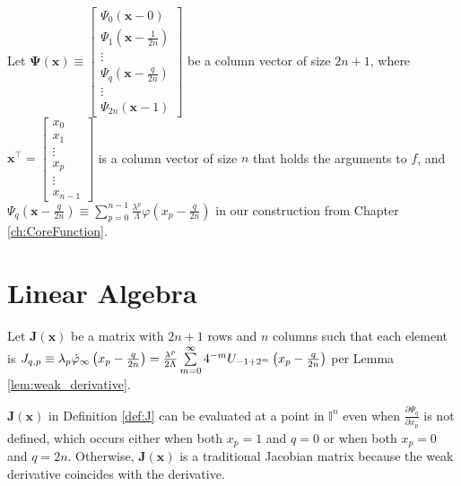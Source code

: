 \begin{definition}
  \label{def:Psi_vector}
  Let $\boldsymbol{\Psi}\left(\mathbf{x}\right) \equiv \begin{bmatrix}
      \Psi_0\left(\mathbf{x} - 0\right) \\
      \Psi_1\left(\mathbf{x} - \frac{1}{2n}\right) \\
      \vdots \\
      \Psi_q\left(\mathbf{x} - \frac{q}{2n}\right) \\
      \vdots \\
      \Psi_{2n}\left(\mathbf{x} - 1\right)
  \end{bmatrix}$ be a column vector of size $2n + 1$, where $\mathbf{x}^\top = \begin{bmatrix}
      x_0 \\ x_1 \\ \vdots \\ x_p \\ \vdots \\ x_{n - 1}
  \end{bmatrix}$ is a column vector of size $n$ that holds the arguments to $f$, and $\Psi_q\left(\mathbf{x} - \frac{q}{2n}\right) \equiv \sum\limits_{p = 0}^{n - 1} \frac{\lambda^p}{\Lambda} \varphi\left(x_p - \frac{q}{2n}\right)$ in our construction from Chapter \ref{ch:CoreFunction}.
\end{definition}

\section{Linear Algebra}\label{sec:LinearAlgebra}

\begin{definition}
  \label{def:J}
  Let $\mathbf{J}\left(\mathbf{x}\right)$ be a matrix with $2n + 1$ rows and $n$ columns such that each element is $J_{q,p} \equiv \lambda_p \dotvarphi[x_p - \frac{q}{2n}]{\infty} = \frac{\lambda^p}{2\Lambda} \sum\limits_{m = 0}^\infty 4^{-m} U_{-1 + 2^m}\left(x_p - \frac{q}{2n}\right)$ per Lemma \ref{lem:weak_derivative}.
\end{definition}
\begin{remark*}
  $\mathbf{J}\left(\mathbf{x}\right)$ in Definition \ref{def:J} can be evaluated at a point in $\mathbb{I}^n$ even when $\frac{\partial \Psi_q}{\partial x_p}$ is not defined, which occurs either when both $x_p = 1$ and $q = 0$ or when both $x_p = 0$ and $q = 2n$. Otherwise, $\mathbf{J}\left(\mathbf{x}\right)$ is a traditional Jacobian matrix because the weak derivative coincides with the derivative.
\end{remark*}

